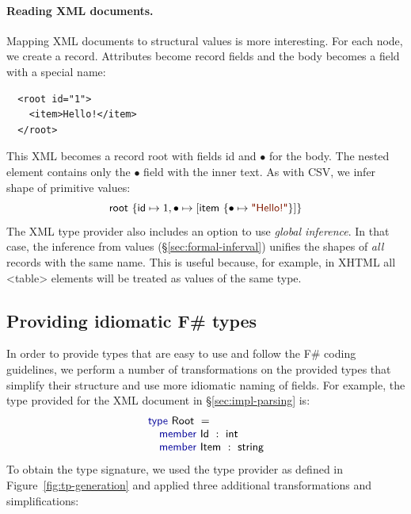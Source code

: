 \documentclass[10pt]{sigplanconf}
\newcommand{\kvd}[1]{\textnormal{\textcolor{kvdclr}{\sffamily #1}}}
\newcommand{\str}[1]{\textnormal{\textcolor{strclr}{\sffamily "#1"}}}
\newcommand{\ident}[1]{\textnormal{\sffamily #1}}
\begin{document}
\paragraph{Reading XML documents.}
Mapping XML documents to structural values is more interesting. For each node, we
create a record. Attributes become record fields and the body becomes a field with a special
name:
%
{\small{
\begin{verbatim}
  <root id="1">
    <item>Hello!</item>
  </root>    
\end{verbatim}
}}
%
\noindent
This XML becomes a record \ident{root} with fields \ident{id} and $\bullet$ for the body. 
The nested element contains only the $\bullet$ field with the inner text. As with CSV, we
infer shape of primitive values:
%
\begin{equation*}
\ident{root}~\{ \ident{id} \mapsto 1, \bullet \mapsto [ \ident{item}~\{ \bullet \mapsto \str{Hello!} \}] \}
\end{equation*}
%
The XML type provider also includes an option to use \emph{global inference}. In that case, 
the inference from values (\S\ref{sec:formal-inferval}) unifies the shapes of \emph{all} records with the 
same name. This is useful because, for example, in XHTML all {\small\ttfamily <table>} elements
will be treated as values of the same type.


\subsection{Providing idiomatic F\# types} 
\label{sec:impl-naming}

In order to provide types that are easy to use and follow the F\# coding guidelines,
we perform a number of transformations on the provided types that simplify their structure
and use more idiomatic naming of fields. For example, the type provided for the XML document in 
\S\ref{sec:impl-parsing} is:
%
\begin{equation*}
\begin{array}{l}
 \kvd{type}~\ident{Root}~=  \\
 \quad \kvd{member}~\ident{Id}~:~\ident{int} \\
 \quad \kvd{member}~\ident{Item}~:~\ident{string}
\end{array}
\end{equation*}
%
To obtain the type signature, we used the type provider as defined in Figure~\ref{fig:tp-generation}
and applied three additional transformations and simplifications:
\end{document}
